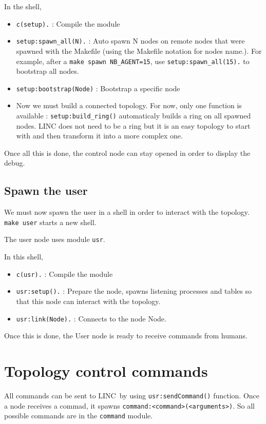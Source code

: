 \documentclass[a4paper,10pt]{report}
\begin{document}
In the shell,
\begin{itemize}
\item \texttt{c(setup).} : Compile the module
\item \texttt{setup:spawn\_all(N).} : Auto spawn N nodes on remote nodes 
that were spawned with the Makefile (using the Makefile notation for
nodes name.). For example, after a  \texttt{make spawn NB\_AGENT=15}, 
use \texttt{setup:spawn\_all(15).} to bootstrap all nodes.
\item \texttt{setup:bootstrap(Node)} : Bootstrap a specific node
\item Now we must build a connected topology. For now, only one function
is available : \texttt{setup:build\_ring()} automaticaly builds a ring
on all spawned nodes. LINC does not need to be a ring but it is an
easy topology to start with and then transform it into a more complex
one.
\end{itemize}

Once all this is done, the control node can stay opened in order to 
display the debug.

\subsection{Spawn the user}
We must now spawn the user in a shell in order to interact with the
topology. \texttt{make user} starts a new shell.

The user node uses module \texttt{usr}.

In this shell,
\begin{itemize}
\item \texttt{c(usr).} : Compile the module
\item \texttt{usr:setup().} : Prepare the node, spawns listening processes
and tables so that this node can interact with the topology.
\item \texttt{usr:link(Node).} : Connects to the node Node.
\end{itemize}

Once this is done, the User node is ready to receive commands from humans.

\section{Topology control commands}
All commands can be sent to LINC by using \texttt{usr:sendCommand()} 
function. Once a node receives a commad, it spawns 
\texttt{command:<command>(<arguments>)}. So all possible commands are 
in the \texttt{command} module.
\end{document}
